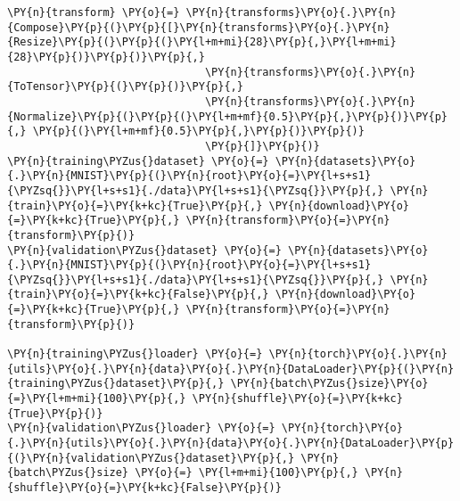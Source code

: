     \begin{tcolorbox}[breakable, size=fbox, boxrule=1pt, pad at break*=1mm,colback=cellbackground, colframe=cellborder]
\begin{Verbatim}[commandchars=\\\{\}]
\PY{n}{transform} \PY{o}{=} \PY{n}{transforms}\PY{o}{.}\PY{n}{Compose}\PY{p}{(}\PY{p}{[}\PY{n}{transforms}\PY{o}{.}\PY{n}{Resize}\PY{p}{(}\PY{p}{(}\PY{l+m+mi}{28}\PY{p}{,}\PY{l+m+mi}{28}\PY{p}{)}\PY{p}{)}\PY{p}{,}
                               \PY{n}{transforms}\PY{o}{.}\PY{n}{ToTensor}\PY{p}{(}\PY{p}{)}\PY{p}{,}
                               \PY{n}{transforms}\PY{o}{.}\PY{n}{Normalize}\PY{p}{(}\PY{p}{(}\PY{l+m+mf}{0.5}\PY{p}{,}\PY{p}{)}\PY{p}{,} \PY{p}{(}\PY{l+m+mf}{0.5}\PY{p}{,}\PY{p}{)}\PY{p}{)}
                               \PY{p}{]}\PY{p}{)}
\PY{n}{training\PYZus{}dataset} \PY{o}{=} \PY{n}{datasets}\PY{o}{.}\PY{n}{MNIST}\PY{p}{(}\PY{n}{root}\PY{o}{=}\PY{l+s+s1}{\PYZsq{}}\PY{l+s+s1}{./data}\PY{l+s+s1}{\PYZsq{}}\PY{p}{,} \PY{n}{train}\PY{o}{=}\PY{k+kc}{True}\PY{p}{,} \PY{n}{download}\PY{o}{=}\PY{k+kc}{True}\PY{p}{,} \PY{n}{transform}\PY{o}{=}\PY{n}{transform}\PY{p}{)}
\PY{n}{validation\PYZus{}dataset} \PY{o}{=} \PY{n}{datasets}\PY{o}{.}\PY{n}{MNIST}\PY{p}{(}\PY{n}{root}\PY{o}{=}\PY{l+s+s1}{\PYZsq{}}\PY{l+s+s1}{./data}\PY{l+s+s1}{\PYZsq{}}\PY{p}{,} \PY{n}{train}\PY{o}{=}\PY{k+kc}{False}\PY{p}{,} \PY{n}{download}\PY{o}{=}\PY{k+kc}{True}\PY{p}{,} \PY{n}{transform}\PY{o}{=}\PY{n}{transform}\PY{p}{)}

\PY{n}{training\PYZus{}loader} \PY{o}{=} \PY{n}{torch}\PY{o}{.}\PY{n}{utils}\PY{o}{.}\PY{n}{data}\PY{o}{.}\PY{n}{DataLoader}\PY{p}{(}\PY{n}{training\PYZus{}dataset}\PY{p}{,} \PY{n}{batch\PYZus{}size}\PY{o}{=}\PY{l+m+mi}{100}\PY{p}{,} \PY{n}{shuffle}\PY{o}{=}\PY{k+kc}{True}\PY{p}{)}
\PY{n}{validation\PYZus{}loader} \PY{o}{=} \PY{n}{torch}\PY{o}{.}\PY{n}{utils}\PY{o}{.}\PY{n}{data}\PY{o}{.}\PY{n}{DataLoader}\PY{p}{(}\PY{n}{validation\PYZus{}dataset}\PY{p}{,} \PY{n}{batch\PYZus{}size} \PY{o}{=} \PY{l+m+mi}{100}\PY{p}{,} \PY{n}{shuffle}\PY{o}{=}\PY{k+kc}{False}\PY{p}{)}
\end{Verbatim}
\end{tcolorbox}


